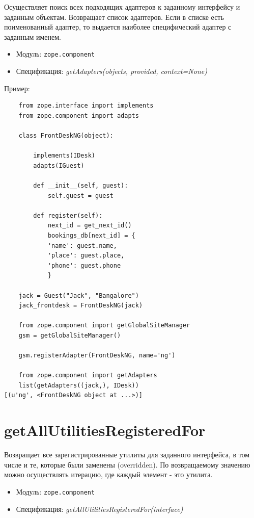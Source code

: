 \documentclass[a4paper,openany,twoside,draft]{book}
\providecommand*{\DUroletitlereference}[1]{\textsl{#1}}
\begin{document}
Осуществляет поиск всех подходящих адаптеров к заданному интерфейсу и заданным объектам.  Возвращает список адаптеров.  Если в списке есть поименованный адаптер, то выдается наиболее специфический адаптер с заданным именем.

\begin{itemize}

\item Модуль: \texttt{zope.component}

\item Спецификация: \DUroletitlereference{getAdapters(objects, provided, context=None)}

\end{itemize}

Пример:

\begin{verbatim}
    from zope.interface import implements
    from zope.component import adapts

    class FrontDeskNG(object):

        implements(IDesk)
        adapts(IGuest)

        def __init__(self, guest):
            self.guest = guest

        def register(self):
            next_id = get_next_id()
            bookings_db[next_id] = {
            'name': guest.name,
            'place': guest.place,
            'phone': guest.phone
            }

    jack = Guest("Jack", "Bangalore")
    jack_frontdesk = FrontDeskNG(jack)

    from zope.component import getGlobalSiteManager
    gsm = getGlobalSiteManager()

    gsm.registerAdapter(FrontDeskNG, name='ng')

    from zope.component import getAdapters
    list(getAdapters((jack,), IDesk))
[(u'ng', <FrontDeskNG object at ...>)]
\end{verbatim}


\section*{getAllUtilitiesRegisteredFor%
  \label{getallutilitiesregisteredfor}%
}

Возвращает все зарегистрированные утилиты для заданного интерфейса, в том числе и те, которые были заменены (overridden).  По возвращаемому значению можно осуществлять итерацию, где каждый элемент - это утилита.

\begin{itemize}

\item Модуль: \texttt{zope.component}

\item Спецификация: \DUroletitlereference{getAllUtilitiesRegisteredFor(interface)}

\end{itemize}
\end{document}

